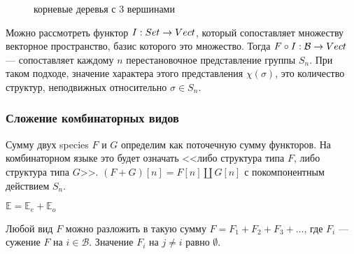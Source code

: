 \begin{figure}
\begin{center}
\end{center}
\caption{корневые деревья с 3 вершинами}
\label{pic:3-rooted-trees}
\end{figure}

Можно рассмотреть функтор $I:Set \rightarrow Vect$, который сопоставляет
множеству векторное пространство, базис которого это множество.
Тогда $F \circ I: \mathcal B \rightarrow Vect$ --- сопоставляет каждому $n$
перестановочное представление группы $S_n$. При таком подходе, значение
характера этого представления $\chi(\sigma)$, это количество структур,
неподвижных относительно $\sigma \in S_n$.

\subsubsection{Сложение комбинаторных видов}
Сумму двух species $F$ и $G$ определим как поточечную сумму функторов.
На комбинаторном языке это будет означать <<либо структура типа $F$, либо
структура типа $G$>>. $(F + G)[n] = F[n] \coprod G[n]$ с покомпонентным
действием $S_n$.
\begin{example}
$\mathbb E = \mathbb E_e + \mathbb E_o$
\end{example}
\begin{example}
Любой вид $F$ можно разложить в такую сумму $F =
F_{1} + F_{2} + F_{3} + \dots$, где $F_{i}$ --- сужение $F$ на $i \in \mathcal
B$. Значение $F_{i}$ на $j \neq i$ равно $\emptyset$.
\end{example}

